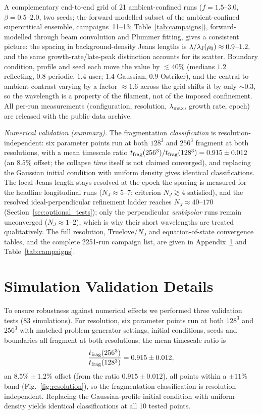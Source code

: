 \documentclass[usenatbib,twoside,twocolumn]{mnras}
\begin{document}
A complementary end-to-end grid of 21 ambient-confined runs ($f=1.5$--$3.0$, $\beta=0.5$--$2.0$, two seeds; the forward-modelled subset of the ambient-confined supercritical ensemble, campaigns~11--13; Table~\ref{tab:campaigns}), forward-modelled through beam convolution and Plummer fitting, gives a consistent picture: the spacing in background-density Jeans lengths is $\lambda/\lambda_{\rm J}(\rho_0)\approx0.9$--$1.2$, and the same growth-rate/late-peak distinction accounts for its scatter. Boundary condition, profile and seed each move the value by $\lesssim40\%$ (medians $1.2$ reflecting, $0.8$ periodic, $1.4$ user; $1.4$ Gaussian, $0.9$ Ostriker), and the central-to-ambient contrast varying by a factor $\approx1.6$ across the grid shifts it by only $\sim0.3$, so the wavelength is a property of the filament, not of the imposed confinement. All per-run measurements (configuration, resolution, $\lambda_{\rm max}$, growth rate, epoch) are released with the public data archive.

\emph{Numerical validation (summary).} The fragmentation \emph{classification} is resolution-independent: six parameter points run at both $128^3$ and $256^3$ fragment at both resolutions, with a mean timescale ratio $t_{\rm frag}(256^3)/t_{\rm frag}(128^3)=0.915\pm0.012$ (an $8.5\%$ offset; the collapse \emph{time} itself is not claimed converged), and replacing the Gaussian initial condition with uniform density gives identical classifications. The local Jeans length stays resolved at the epoch the spacing is measured for the headline longitudinal runs ($N_J\approx5$--$7$; \citet{Truelove1997} criterion $N_J\gtrsim4$ satisfied), and the resolved ideal-perpendicular refinement ladder reaches $N_J\approx40$--$170$ (Section~\ref{sec:optional_tests}); only the perpendicular \emph{ambipolar} runs remain unconverged ($N_J\approx1$--$2$), which is why their short wavelengths are treated qualitatively. The full resolution, Truelove/$N_J$ and equation-of-state convergence tables, and the complete 2251-run campaign list, are given in Appendix~\ref{sec:validation} and Table~\ref{tab:campaigns}.


\section{Simulation Validation Details}
\label{sec:validation}

To ensure robustness against numerical effects we performed three validation tests (83 simulations). For resolution, six parameter points run at both $128^3$ and $256^3$ with matched problem-generator settings, initial conditions, seeds and boundaries all fragment at both resolutions; the mean timescale ratio is
\begin{equation}
\frac{t_{\rm frag}(256^3)}{t_{\rm frag}(128^3)} = 0.915 \pm 0.012,
\end{equation}
an $8.5\%\pm1.2\%$ offset (from the ratio $0.915\pm0.012$), all points within a $\pm11\%$ band (Fig.~\ref{fig:resolution}), so the fragmentation classification is resolution-independent. Replacing the Gaussian-profile initial condition with uniform density yields identical classifications at all 10 tested points.
\end{document}
